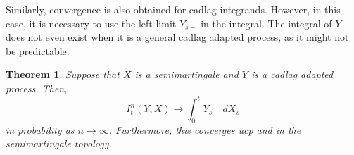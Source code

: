 \documentclass[12pt]{article}
\newtheorem{theorem}{Theorem}
\begin{document}
Similarly, convergence is also obtained for cadlag integrands. However, in this case, it is necessary to use the left limit $Y_{s-}$ in the integral. The integral of $Y$ does not even exist when it is a general cadlag adapted process, as it might not be predictable.

\begin{theorem}
Suppose that $X$ is a semimartingale and $Y$ is a cadlag adapted process. Then,
\begin{equation*}
I^n_t(Y,X)\rightarrow\int_0^t Y_{s-}\,dX_s
\end{equation*}
in probability as $n\rightarrow\infty$. Furthermore, this converges ucp and in the semimartingale topology.
\end{theorem}

\end{document}
